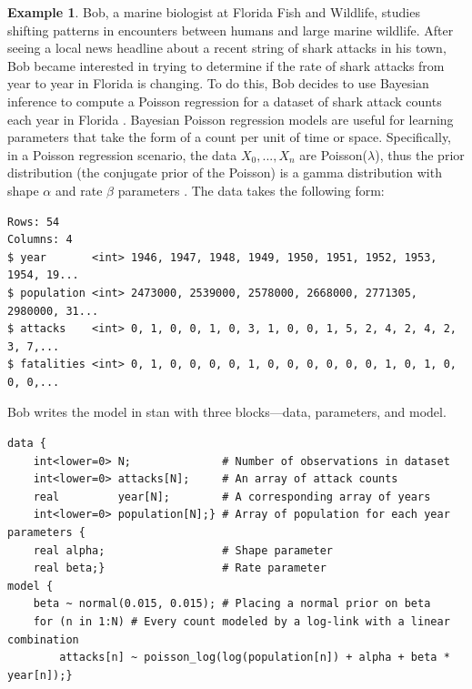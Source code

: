 \documentclass[
  12pt,
]{book}
\theoremstyle{definition}
\theoremstyle{definition}
\newtheorem{example}{Example}[chapter]
\theoremstyle{definition}
\theoremstyle{remark}
\begin{document}
\begin{example}
\protect\hypertarget{exm:stan}{}{\label{exm:stan} }Bob, a marine biologist at Florida Fish and Wildlife, studies shifting patterns in encounters between humans and large marine wildlife.
After seeing a local news headline about a recent string of shark attacks in his town, Bob became interested in trying to determine if the rate of shark attacks from year to year in Florida is changing. To do this, Bob decides to use Bayesian inference to compute a Poisson regression for a dataset of shark attack counts each year in Florida \citep{Collier2018}. Bayesian Poisson regression models are useful for learning parameters that take the form of a count per unit of time or space. Specifically, in a Poisson regression scenario, the data \(X_0,...,X_n\) are Poisson(\(\lambda\)), thus the prior distribution (the conjugate prior of the Poisson) is a gamma distribution with shape \(\alpha\) and rate \(\beta\) parameters \citep{Hitchcock2014}. The data takes the following form:
\end{example}

\begin{verbatim}
Rows: 54
Columns: 4
$ year       <int> 1946, 1947, 1948, 1949, 1950, 1951, 1952, 1953, 1954, 19...
$ population <int> 2473000, 2539000, 2578000, 2668000, 2771305, 2980000, 31...
$ attacks    <int> 0, 1, 0, 0, 1, 0, 3, 1, 0, 0, 1, 5, 2, 4, 2, 4, 2, 3, 7,...
$ fatalities <int> 0, 1, 0, 0, 0, 0, 1, 0, 0, 0, 0, 0, 0, 1, 0, 1, 0, 0, 0,...
\end{verbatim}

Bob writes the model in stan with three blocks---data, parameters, and model.

\begin{verbatim}
data {
    int<lower=0> N;              # Number of observations in dataset
    int<lower=0> attacks[N];     # An array of attack counts
    real         year[N];        # A corresponding array of years
    int<lower=0> population[N];} # Array of population for each year
parameters {
    real alpha;                  # Shape parameter
    real beta;}                  # Rate parameter
model {
    beta ~ normal(0.015, 0.015); # Placing a normal prior on beta
    for (n in 1:N) # Every count modeled by a log-link with a linear combination
        attacks[n] ~ poisson_log(log(population[n]) + alpha + beta * year[n]);}
\end{verbatim}
\end{document}
